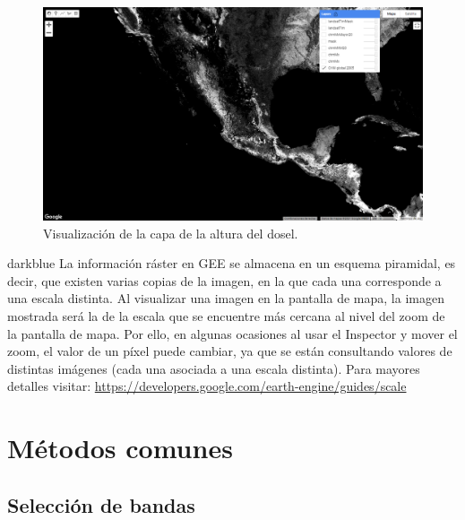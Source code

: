 \documentclass[
  12pt,
  letterpaper,
  twoside]{book}
\begin{document}
\begin{figure}[H]

{\centering \includegraphics[width=0.95\linewidth]{Img/ej274} 

}

\caption{Visualización de la capa de la altura del dosel.}\label{fig:f94}
\end{figure}

\begin{bluebox2}

\begin{awesomeblock}{5pt}{\faLightbulb}{darkblue}
La información ráster en GEE se almacena en un esquema piramidal, es decir, que existen varias copias de la imagen, en la que cada una corresponde a una escala distinta. Al visualizar una imagen en la pantalla de mapa, la imagen mostrada será la de la escala que se encuentre más cercana al nivel del zoom de la pantalla de mapa. Por ello, en algunas ocasiones al usar el Inspector y mover el zoom, el valor de un píxel puede cambiar, ya que se están consultando valores de distintas imágenes (cada una asociada a una escala distinta). Para mayores detalles visitar: \url{https://developers.google.com/earth-engine/guides/scale}

\end{awesomeblock}

\end{bluebox2}

\hypertarget{muxe9todos-comunes-3}{%
\section{Métodos comunes}\label{muxe9todos-comunes-3}}

\hypertarget{selecciuxf3n-de-bandas}{%
\subsection*{Selección de bandas}\label{selecciuxf3n-de-bandas}}
\end{document}
